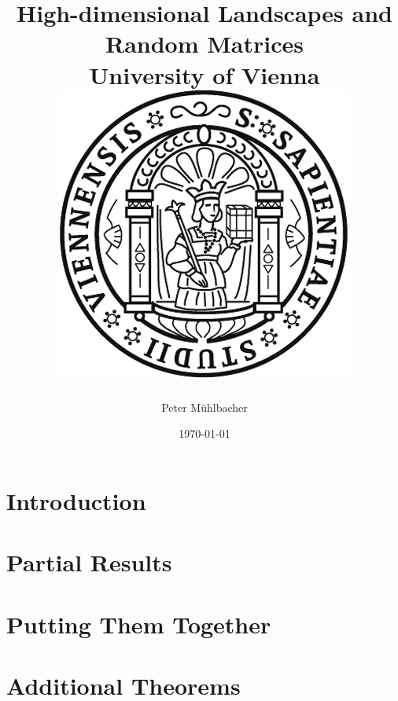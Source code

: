 \documentclass[11pt]{report}
\begin{document}
\title{
	{High-dimensional Landscapes and Random Matrices}\\
	{\large University of Vienna}\\
	{\includegraphics{university.png}}
}
\author{Peter Mühlbacher}
\date{\today}
\maketitle

\begin{abstract}
\end{abstract}

\tableofcontents

\chapter*{Introduction}


\chapter{Partial Results}\label{chap:prerequisites}


\chapter{Putting Them Together}\label{chap:centralidentities}


\appendix
\chapter{Additional Theorems}




\end{document}
